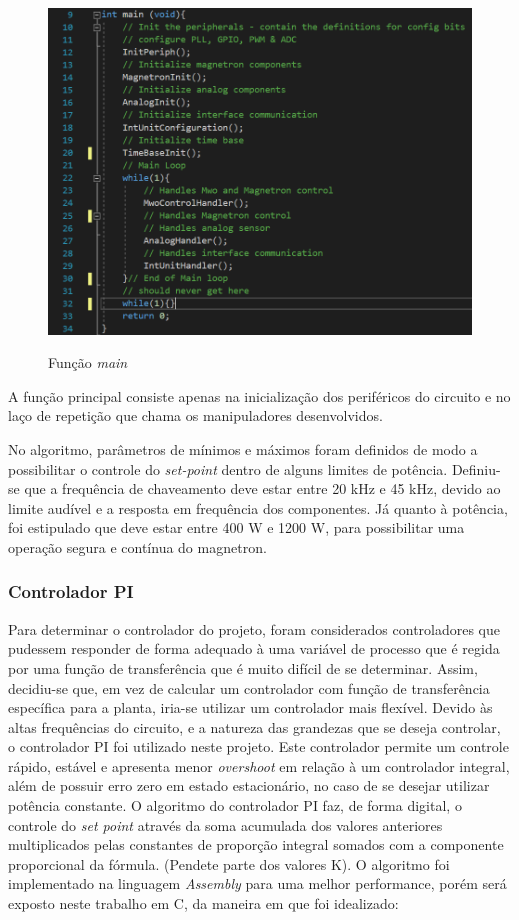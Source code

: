 \begin{figure}[H]
    \centering
    \caption{Função \textit{main}}
    \includegraphics[width=1\textwidth]{./dados/figuras/func_main}
    \label{fig:figura-func-main}
\end{figure}

A função principal consiste apenas na inicialização dos periféricos do circuito e no laço de repetição que chama os manipuladores desenvolvidos.

No algoritmo, parâmetros de mínimos e máximos foram definidos de modo a possibilitar o controle do \textit{set-point} dentro de alguns limites de potência. Definiu-se que a frequência de chaveamento deve estar entre 20 kHz e 45 kHz, devido ao limite audível e a resposta em frequência dos componentes. Já quanto à potência, foi estipulado que deve estar entre 400 W e 1200 W, para possibilitar uma operação segura e contínua do magnetron.

\subsubsection{Controlador PI}
Para determinar o controlador do projeto, foram considerados controladores que pudessem responder de forma adequado à uma variável de processo que é regida por uma função de transferência que é muito difícil de se determinar. Assim, decidiu-se que, em vez de calcular um controlador com função de transferência específica para a planta, iria-se utilizar um controlador mais flexível. Devido às altas frequências do circuito, e a natureza das grandezas que se deseja controlar, o controlador PI foi utilizado neste projeto. Este controlador permite um controle rápido, estável e apresenta menor \textit{overshoot} em relação à um controlador integral, além de possuir erro zero em estado estacionário, no caso de se desejar utilizar potência constante. O algoritmo do controlador PI faz, de forma digital, o controle do \textit{set point} através da soma acumulada dos valores anteriores multiplicados pelas constantes de proporção integral somados com a componente proporcional da fórmula. (Pendete parte dos valores K).
O algoritmo foi implementado na linguagem \textit{Assembly} para uma melhor performance, porém será exposto neste trabalho em C, da maneira em que foi idealizado:

